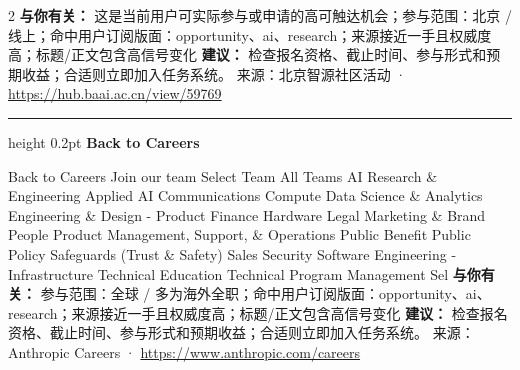 \documentclass[10.5pt]{ctexart}
\begin{document}
\begin{multicols}{2}
\textbf{与你有关：} 这是当前用户可实际参与或申请的高可触达机会；参与范围：北京 / 线上；命中用户订阅版面：opportunity、ai、research；来源接近一手且权威度高；标题/正文包含高信号变化
\textbf{建议：} 检查报名资格、截止时间、参与形式和预期收益；合适则立即加入任务系统。
{\footnotesize\color{ormuted} 来源：北京智源社区活动 · \url{https://hub.baai.ac.cn/view/59769}}
\vspace{2mm}
\hrule height 0.2pt
\vspace{2mm}
{\large\bfseries Back to Careers}\par
Back to Careers Join our team Select Team All Teams AI Research \& Engineering Applied AI Communications Compute Data Science \& Analytics Engineering \& Design - Product Finance Hardware Legal Marketing \& Brand People Product Management, Support, \& Operations Public Benefit Public Policy Safeguards (Trust \& Safety) Sales Security Software Engineering - Infrastructure Technical Education Technical Program Management Sel
\textbf{与你有关：} 参与范围：全球 / 多为海外全职；命中用户订阅版面：opportunity、ai、research；来源接近一手且权威度高；标题/正文包含高信号变化
\textbf{建议：} 检查报名资格、截止时间、参与形式和预期收益；合适则立即加入任务系统。
{\footnotesize\color{ormuted} 来源：Anthropic Careers · \url{https://www.anthropic.com/careers}}
\end{multicols}
\end{document}
